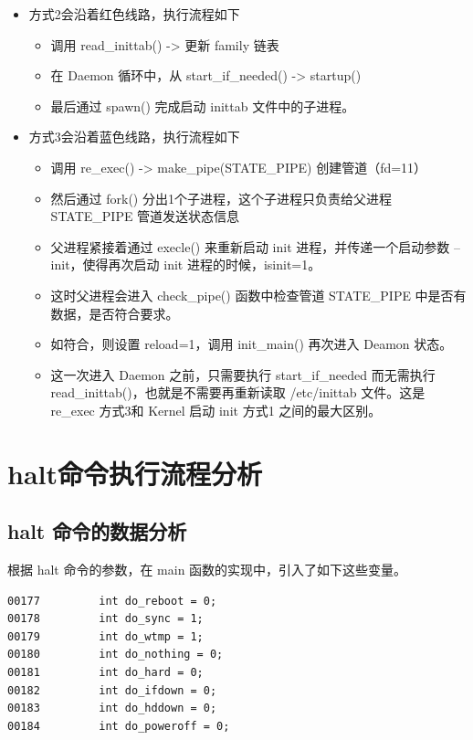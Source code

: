 \begin{itemize}
\item
  方式2会沿着红色线路，执行流程如下
  \begin{itemize}
  \item
    调用 read\_inittab() -\textgreater{} 更新 family 链表
  \item
    在 Daemon 循环中，从 start\_if\_needed() -\textgreater{} startup()
  \item
    最后通过 spawn() 完成启动 inittab 文件中的子进程。
  \end{itemize}
\item
  方式3会沿着蓝色线路，执行流程如下
  \begin{itemize}
  \item
    调用 re\_exec() -\textgreater{} make\_pipe(STATE\_PIPE)
    创建管道（fd=11）
  \item
    然后通过 fork() 分出1个子进程，这个子进程只负责给父进程 STATE\_PIPE
    管道发送状态信息
  \item
    父进程紧接着通过 execle() 来重新启动 init 进程，并传递一个启动参数
    --init，使得再次启动 init 进程的时候，isinit=1。
  \item
    这时父进程会进入 check\_pipe() 函数中检查管道 STATE\_PIPE
    中是否有数据，是否符合要求。
  \item
    如符合，则设置 reload=1，调用 init\_main() 再次进入 Deamon 状态。
  \item
    这一次进入 Daemon 之前，只需要执行 start\_if\_needed 而无需执行
    read\_inittab()，也就是不需要再重新读取 /etc/inittab 文件。这是
    re\_exec 方式3和 Kernel 启动 init 方式1 之间的最大区别。
  \end{itemize}
\end{itemize}
\section{halt命令执行流程分析}

\subsection{halt 命令的数据分析}

根据 halt 命令的参数，在 main 函数的实现中，引入了如下这些变量。

{\begin{shaded}\begin{verbatim}
00177         int do_reboot = 0;
00178         int do_sync = 1;
00179         int do_wtmp = 1;
00180         int do_nothing = 0;
00181         int do_hard = 0;
00182         int do_ifdown = 0;
00183         int do_hddown = 0;
00184         int do_poweroff = 0;
\end{verbatim}\end{shaded}}
